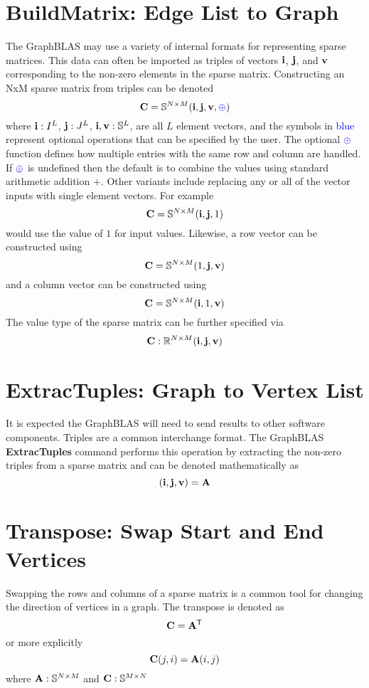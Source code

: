 \section{BuildMatrix: Edge List to Graph}
  The GraphBLAS may use a variety of internal formats for representing sparse matrices.  This data can often be imported as triples of vectors ${\bf i}$, ${\bf j}$, and ${\bf v}$ corresponding to the non-zero elements in the sparse matrix.  Constructing an NxM sparse matrix from triples can be denoted
$$
   \mathbf{C} = \mathbb{S}^{N \times M}({\bf i},{\bf j},{\bf v},{\textcolor{blue}{\oplus}})
$$
where ${\bf i} : I^L$, ${\bf j}: J^L$, ${\bf i}, {\bf v}: \mathbb{S}^L$, are all $L$ element vectors, and the symbols in \textcolor{blue}{blue} represent optional operations that can be specified by the user.  The optional  ${\textcolor{blue}{\oplus}}$ function defines how multiple entries with the same row and column are handled.  If ${\textcolor{blue}{\oplus}}$ is undefined then the default is to combine the values using standard arithmetic addition $+$.  Other variants include replacing any or all of the vector inputs with single element vectors.  For example
$$
   \mathbf{C} = \mathbb{S}^{N \times M}({\bf i},{\bf j},1)
$$
would use the value of $1$ for input values.  Likewise, a row vector can be constructed using
$$
   \mathbf{C} = \mathbb{S}^{N \times M}(1,{\bf j},{\bf v})
$$
and a column vector can be constructed using
$$
   \mathbf{C} = \mathbb{S}^{N \times M}({\bf i},1,{\bf v})
$$
The value type of the sparse matrix can be further specified via
$$
   \mathbf{C}: \mathbb{R}^{N \times M}({\bf i},{\bf j},{\bf v})
$$

\section{ExtracTuples: Graph to Vertex List}
  It is expected the GraphBLAS will need to send results to other software components.  Triples are a common interchange format.  The GraphBLAS {\bf ExtracTuples} command performs this operation by extracting the non-zero triples from a sparse matrix and can be denoted mathematically as
$$
	({\bf i},{\bf j},{\bf v}) = {\bf A}
$$

\section{Transpose: Swap Start and End Vertices}
  Swapping the rows and columns of a sparse matrix is a common tool for changing the direction of vertices in a graph.  The transpose is denoted as
$$
     {\bf C} = {\bf A}^{\sf T}
$$   
or more explicitly
$$
     {\bf C}(j,i) = {\bf A}(i,j)
$$   
where ${\bf A}:\mathbb{S}^{N \times M}$ and ${\bf C}:\mathbb{S}^{M \times N}$

